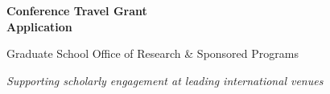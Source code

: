 \documentclass[11pt,letterpaper]{article}
\begin{document}

\begin{center}
  {\Huge\bfseries\color{accent}Conference Travel Grant\\[2pt] Application}
  \vspace{8pt}

  {\large\color{medium}Graduate School \quad\textbullet\quad Office of Research \& Sponsored Programs}
  \vspace{4pt}

  {\small\color{medium}\textit{Supporting scholarly engagement at leading international venues}}
\end{center}

\vspace{2pt}









\end{document}

